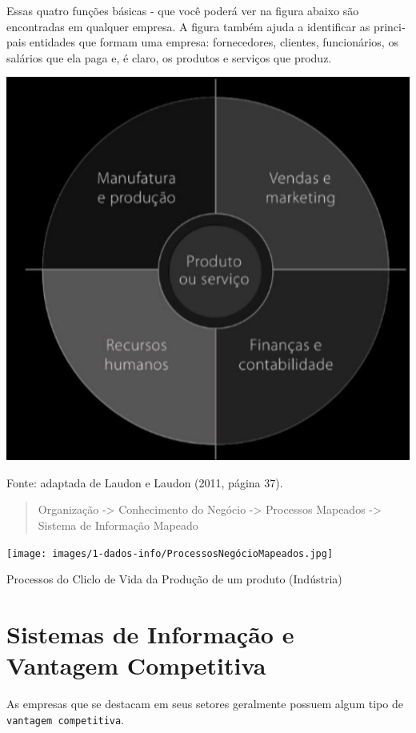 \documentclass[
]{book}
\begin{document}
Essas quatro funções básicas - que você poderá ver na figura abaixo são encontradas em qualquer empresa. A figura também ajuda a identificar as princi­ pais entidades que formam uma empresa: fornecedores, clientes, funcionários, os salários que ela paga e, é claro, os produtos e serviços que produz.

\includegraphics{images/1-dados-info/AreasBasicasEmpresa.jpg}

Fonte: adaptada de Laudon e Laudon (2011, página 37).

\begin{quote}
Organização -\textgreater{} Conhecimento do Negócio -\textgreater{} Processos Mapeados -\textgreater{} Sistema de Informação Mapeado
\end{quote}

\texttt{[image: images/1-dados-info/ProcessosNegócioMapeados.jpg]}

Processos do Cliclo de Vida da Produção de um produto (Indústria)

\section{Sistemas de Informação e Vantagem Competitiva}\label{sistemas-de-informauxe7uxe3o-e-vantagem-competitiva}

As empresas que se destacam em seus setores geralmente possuem algum tipo de \texttt{vantagem\ competitiva}.
\end{document}
